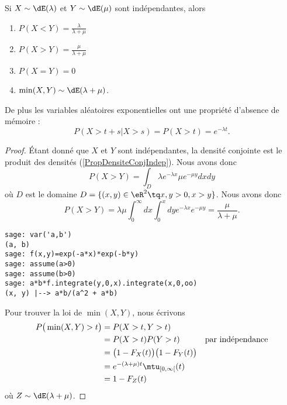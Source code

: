 \begin{proposition}
    Si \( X\sim\dE(\lambda)\) et \( Y\sim\dE(\mu)\) sont indépendantes, alors
    \begin{enumerate}
        \item
            \( P(X<Y)=\frac{ \lambda }{ \lambda+\mu }\)
        \item
            \( P(X>Y)=\frac{ \mu }{ \lambda+\mu }\)
        \item
            \( P(X=Y)=0\)
        \item
            \( \min(X,Y)\sim\dE(\lambda+\mu)\).
    \end{enumerate}
    De plus les variables aléatoires exponentielles ont une propriété d'absence de mémoire :
    \begin{equation}
        P(X>t+s|X>s)=P(X>t)= e^{-\lambda t}.
    \end{equation}
\end{proposition}

\begin{proof}
    Étant donné que \( X\) et \( Y\) sont indépendantes, la densité conjointe est le produit des densités (\ref{PropDensiteConjIndep}). Nous avons donc
    \begin{equation}
        P(X>Y)=\int_D\lambda e^{-\lambda x}\mu e^{-\mu y}dxdy
    \end{equation}
    où \( D\) est le domaine \( D=\{ (x,y)\in \eR^2\tq x,y>0, x>y \}\). Nous avons donc
    \begin{equation}
        P(X>Y)=\lambda\mu\int_0^{\infty}dx\int_0^xdy  e^{-\lambda x} e^{-\mu y}=\frac{ \mu }{ \lambda+\mu }.
    \end{equation}
    \begin{verbatim}
sage: var('a,b')
(a, b)
sage: f(x,y)=exp(-a*x)*exp(-b*y)
sage: assume(a>0)
sage: assume(b>0)
sage: a*b*f.integrate(y,0,x).integrate(x,0,oo)
(x, y) |--> a*b/(a^2 + a*b)
    \end{verbatim}
    
    Pour trouver la loi de \( \min(X,Y)\), nous écrivons
    \begin{subequations}
        \begin{align}
            P\big( \min(X,Y)>t \big)&=P(X>t,Y>t)\\
            &=P(X>t)P(Y>t)  &\text{par indépendance}\\
            &=\big( 1-F_X(t) \big)\big( 1-F_Y(t) \big)\\
            &= e^{-(\lambda+\mu)t}\mtu_{\mathopen[ 0 , \infty [}(t)\\
            &=1-F_Z(t)
        \end{align}
    \end{subequations}
    où \( Z\sim \dE(\lambda+\mu)\).
\end{proof}

